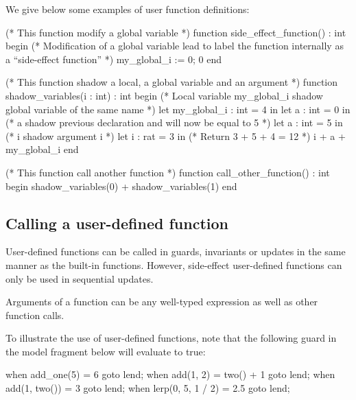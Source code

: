 \begin{example}
We give below some examples of user function definitions:

\begin{IMITATORmodel}

	(* This function modify a global variable *)
	function side_effect_function() : int
	begin
		(* Modification of a global variable lead to label the function internally as a ``side-effect function'' *)
		my_global_i := 0;
		0
	end

	(* This function shadow a local, a global variable and an argument *)
	function shadow_variables(i : int) : int
	begin
		(* Local variable my_global_i shadow global variable of the same name *)
		let my_global_i : int = 4 in
		let a : int = 0 in
		(* a shadow previous declaration and will now be equal to 5 *)
		let a : int = 5 in
		(* i shadow argument i *)
		let i : rat = 3 in
		(* Return 3 + 5 + 4 = 12 *)
		i + a + my_global_i
	end

	(* This function call another function *)
	function call_other_function() : int
	begin
		shadow_variables(0) + shadow_variables(1)
	end

\end{IMITATORmodel}
\end{example}

\subsection{Calling a user-defined function}

User-defined functions can be called in guards, invariants or updates in the same manner as the built-in functions.
However, side-effect user-defined functions can only be used in sequential updates.

Arguments of a function can be any well-typed expression as well as other function calls.

\begin{example}
To illustrate the use of user-defined functions, note that the following guard in the model fragment below will evaluate to true:

\begin{IMITATORmodel}
	when add_one(5) = 6 goto lend;
	when add(1, 2) = two() + 1 goto lend;
	when add(1, two()) = 3 goto lend;
	when lerp(0, 5, 1 / 2) = 2.5 goto lend;
\end{IMITATORmodel}
\end{example}

